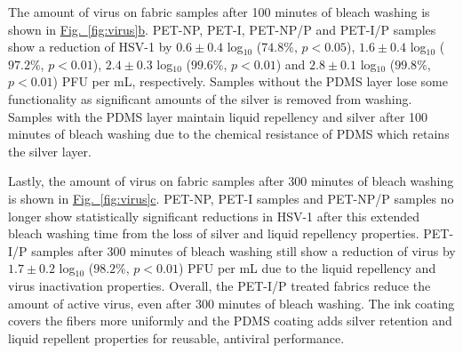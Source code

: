 \documentclass[journal=jacsat,manuscript=article]{achemso}
\newcommand{\figref}[2][]{\hyperref[#2]{Fig.~\ref{#2}#1}}
\begin{document}
The amount of virus on fabric samples after 100 minutes of bleach washing is shown in \figref[b]{fig:virus}. PET-NP, PET-I, PET-NP/P and PET-I/P samples show a reduction of HSV-1 by $0.6 \pm 0.4$ log$_{10}$ ($74.8 %
\%$, $p < 0.05$), $1.6 \pm 0.4$ log$_{10}$ ($97.2 %
\%$, $p < 0.01$), $2.4 \pm 0.3$ log$_{10}$ ($99.6 %
\%$, $p < 0.01$) and $2.8 \pm 0.1$ log$_{10}$ ($99.8 %
\%$, $p < 0.01$) PFU per mL,  respectively. Samples without the PDMS layer lose some functionality as significant amounts of the silver is removed from washing. Samples with the PDMS layer maintain liquid repellency and silver after 100 minutes of bleach washing due to the chemical resistance of PDMS which retains the silver layer. 


Lastly, the amount of virus on fabric samples after 300 minutes of bleach washing is shown in \figref[c]{fig:virus}. PET-NP, PET-I samples and PET-NP/P samples no longer show statistically significant reductions in HSV-1 after this extended bleach washing time from the loss of silver and liquid repellency properties. PET-I/P samples after 300 minutes of bleach washing still show a reduction of virus by $1.7 \pm 0.2$ log$_{10}$ ($98.2 %
\%$, $p < 0.01$) PFU per mL due to the liquid repellency and virus inactivation properties. %
Overall, the PET-I/P treated fabrics reduce the amount of active virus, even after 300 minutes of bleach washing. The ink coating covers the fibers more uniformly and the PDMS coating adds silver retention and liquid repellent properties for reusable, antiviral performance.
\end{document}
